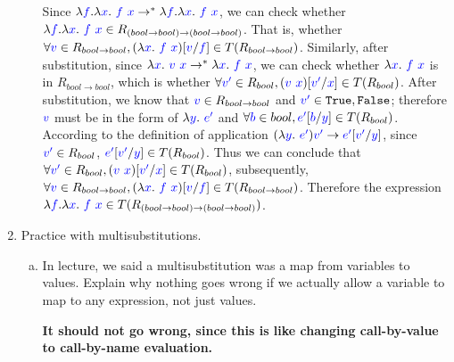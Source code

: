 \documentclass{article}
\newcommand{\meta}[1]{{\color{blue}#1}}
\begin{document}
\begin{enumerate}[resume*]
\begin{enumerate}[(a)]
    Since $\lambda \meta{f}.\lambda \meta{x}.\ \meta{f}\ \meta{x} \to^* \lambda \meta{f}.\lambda \meta{x}.\ \meta{f}\ \meta{x}$, we can check whether $\lambda \meta{f}.\lambda \meta{x}.\ \meta{f}\ \meta{x} \in R_{(bool \to bool)\to (bool \to bool)}$. That is, whether $\forall \meta{v} \in R_{bool \to bool}, (\lambda \meta{x}.\ \meta{f}\ \meta{x})[\meta{v}/\meta{f}] \in T(R_{bool \to bool})$. Similarly, after substitution, since $\lambda \meta{x}.\ \meta{v}\ \meta{x} \to^* \lambda \meta{x}.\ \meta{f}\ \meta{x}$, we can check whether $\lambda \meta{x}.\ \meta{f}\ \meta{x}$ is in $R_{bool \to bool}$, which is whether $\forall \meta{v^\prime} \in R_{bool}, (\meta{v}\ \meta{x})[\meta{v^\prime}/\meta{x}] \in T(R_{bool})$. After substitution, we know that $\meta{v} \in R_{bool \to bool}$ and $\meta{v^\prime} \in \set{\texttt{True}, \texttt{False}}$; therefore $\meta{v}$ must be in the form of $\lambda \meta{y}.\ \meta{e^\prime}$ and $\forall \meta{b}\in bool, \meta{e^\prime}[\meta{b}/\meta{y}]\in T(R_{bool})$. According to the definition of application $(\lambda \meta{y}.\ \meta{e^\prime}) \meta{v^\prime} \to \meta{e^\prime}[\meta{v^\prime}/\meta{y}]$, since $\meta{v^\prime} \in R_{bool}$, $\meta{e^\prime}[\meta{v^\prime}/\meta{y}] \in T(R_{bool})$. Thus we can conclude that $\forall \meta{v^\prime} \in R_{bool}, (\meta{v}\ \meta{x})[\meta{v^\prime}/\meta{x}] \in T(R_{bool})$, subsequently, $\forall \meta{v}\in R_{bool \to bool}, (\lambda\meta{x}.\ \meta{f}\ \meta{x})[\meta{v}/\meta{f}] \in T(R_{bool \to bool})$. Therefore the expression $\lambda \meta{f}.\lambda \meta{x}.\ \meta{f}\ \meta{x} \in T(R_{(bool \to bool) \to (bool \to bool)})$.

  \end{enumerate}
\item Practice with multisubstitutions.
  \begin{enumerate}[(a)]
  \item In lecture, we said a multisubstitution was a map from variables to
    values.  Explain why nothing goes wrong if we actually allow a variable to
    map to any expression, not just values.

    \textbf{It should not go wrong, since this is like changing call-by-value to call-by-name evaluation.}


\end{enumerate}
\end{enumerate}
\end{document}
